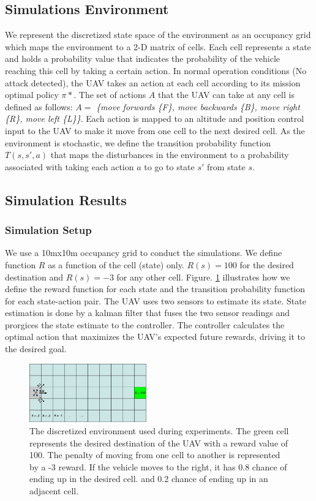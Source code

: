 \documentclass[letterpaper, 10 pt, conference]{ieeeconf}  %
\begin{document}
\subsection{Simulations Environment}
 We represent the discretized state space of the environment as an occupancy grid which maps the environment to a 2-D matrix of cells. Each cell represents a state and holds a probability value that indicates the probability of the vehicle reaching this cell by taking a certain action.
In normal operation conditions (No attack detected), the UAV takes an action at each cell according to its mission optimal policy $\pi*$. The set of actions $A$ that the UAV can take at any cell is defined as follows:
$A =$ \textit{\{move forwards \{F\}, move backwards \{B\}, move right \{R\}, move left \{L\}\}}.
Each action is mapped to an altitude and position control input to the UAV to make it move from one cell to the next desired cell. As the environment is stochastic, we define the transition probability function $T(s,s',a)$ that maps the disturbances in the environment to a probability associated with taking each action $a$ to go to state $s'$ from state $s$.
\subsection{Simulation Results}
\subsubsection{Simulation Setup}
We use a 10mx10m occupancy grid to conduct the simulations. We define function $R$ as a function of the cell (state) only. $R(s) = 100$ for the desired destination and $R(s) = -3$ for any other cell. Figure. \ref{fig:sim-env} illustrates how we define the reward function for each state and the transition probability function for each state-action pair. The UAV uses two sensors to estimate its state. State estimation is done by a kalman filter that fuses the two sensor readings and prorgices the state estimate to the controller. The controller calculates the optimal action that maximizes the UAV's expected future rewards, driving it to the desired goal.
\begin{figure}[h]
\centering
\includegraphics[width=0.45\textwidth]{sim-env}
\caption{The discretized environment used during experiments. The green cell represents the desired destination of the UAV with a reward value of 100. The penalty of moving from one cell to another is represented by a -3 reward. If the vehicle moves to the right, it has 0.8 chance of ending up in the desired cell. and 0.2 chance of ending up in an adjacent cell.}
 \label{fig:sim-env}
\end{figure}
\end{document}
